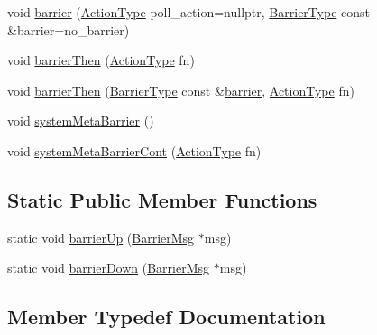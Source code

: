 \begin{DoxyCompactItemize}
\item 
void \hyperlink{structvt_1_1collective_1_1barrier_1_1_barrier_a05124050c7d353a4f3475ee1875dd46a}{barrier} (\hyperlink{namespacevt_ae0a5a7b18cc99d7b732cb4d44f46b0f3}{Action\+Type} poll\+\_\+action=nullptr, \hyperlink{namespacevt_a25e481f0d6bbc7204db23d1c87a62e77}{Barrier\+Type} const \&barrier=no\+\_\+barrier)
\item 
void \hyperlink{structvt_1_1collective_1_1barrier_1_1_barrier_a21adace64047e0e773fb4b55846aab2e}{barrier\+Then} (\hyperlink{namespacevt_ae0a5a7b18cc99d7b732cb4d44f46b0f3}{Action\+Type} fn)
\item 
void \hyperlink{structvt_1_1collective_1_1barrier_1_1_barrier_a3f1be86145f4b0fe20d6ffd67a285e53}{barrier\+Then} (\hyperlink{namespacevt_a25e481f0d6bbc7204db23d1c87a62e77}{Barrier\+Type} const \&\hyperlink{structvt_1_1collective_1_1barrier_1_1_barrier_a05124050c7d353a4f3475ee1875dd46a}{barrier}, \hyperlink{namespacevt_ae0a5a7b18cc99d7b732cb4d44f46b0f3}{Action\+Type} fn)
\item 
void \hyperlink{structvt_1_1collective_1_1barrier_1_1_barrier_a31b7fc393348cd50a9beac2372aabd79}{system\+Meta\+Barrier} ()
\item 
void \hyperlink{structvt_1_1collective_1_1barrier_1_1_barrier_ad3c1ad5f531262cfebcfd4295db341d4}{system\+Meta\+Barrier\+Cont} (\hyperlink{namespacevt_ae0a5a7b18cc99d7b732cb4d44f46b0f3}{Action\+Type} fn)
\end{DoxyCompactItemize}
\subsection*{Static Public Member Functions}
\begin{DoxyCompactItemize}
\item 
static void \hyperlink{structvt_1_1collective_1_1barrier_1_1_barrier_ab229e28e7dea8c0dcdaf07b13173984d}{barrier\+Up} (\hyperlink{structvt_1_1collective_1_1barrier_1_1_barrier_msg}{Barrier\+Msg} $\ast$msg)
\item 
static void \hyperlink{structvt_1_1collective_1_1barrier_1_1_barrier_a81c35871762c47ea8901fe70ac9b8082}{barrier\+Down} (\hyperlink{structvt_1_1collective_1_1barrier_1_1_barrier_msg}{Barrier\+Msg} $\ast$msg)
\end{DoxyCompactItemize}


\subsection{Member Typedef Documentation}
\mbox{\label{structvt_1_1collective_1_1barrier_1_1_barrier_a9b612818f7b44ca65f2caee0dee094f3}} 
